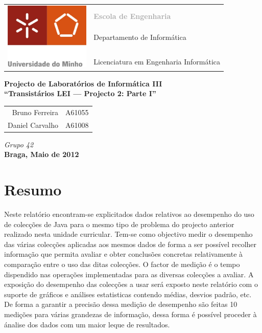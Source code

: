 \documentclass[a5paper,twocolumn, 11pt]{article}
\begin{document}
\onecolumn
\thispagestyle{empty}
\begin{tabular}{ll}
    \multirow{7}{*}{ \includegraphics[height=90pt]{logo.jpeg} }
    &\\
    & \textcolor{DarkGray}{\Large{\textbf{Escola de Engenharia}}} \\
    &\\
    & \large{Departamento de Informática}\\
    &\\
    &\\
    & \large{Licenciatura em Engenharia Informática}\\
\end{tabular}
\begin{center}
    \Large{\textbf{Projecto de Laboratórios de Informática III}}\\
    \vspace{20pt}
    \Large{\textbf{``Transistários LEI --- Projecto 2: Parte I''}}\\
    \vspace{15pt}
    \begin{tabular}{r@{, }l}
        Bruno Ferreira&A61055\\
        Daniel Carvalho&A61008\\
    \end{tabular}
    
    \vspace{5pt}
    \emph{Grupo 42}\\\vspace{15pt}
    \large{\textbf{Braga, Maio de 2012}}
\end{center}

\newpage
\twocolumn
\tableofcontents
\newpage
\listoffigures

\newpage
\section{Resumo}
Neste relatório encontram-se explicitados dados relativos ao desempenho do uso de colecções de Java para o mesmo tipo de problema do projecto anterior realizado nesta unidade curricular. Tem-se como objectivo medir o desempenho das várias colecções aplicadas aos mesmos dados de forma a ser possível recolher informação que permita avaliar e obter conclusões concretas relativamente à comparação entre o uso das ditas colecções. O factor de medição é o tempo dispendido nas operações implementadas para as diversas colecções a avaliar. A exposição do desempenho das colecções a usar será exposto neste relatório com o suporte de gráficos e análises estatisticas contendo médias, desvios padrão, etc.
De forma a garantir a precisão dessa medição de desempenho são feitas 10 medições para várias grandezas de informação, dessa forma é possível proceder à ánalise dos dados com um maior leque de resultados.
\end{document}
